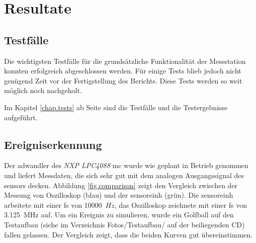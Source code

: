 %
%

\chapter{Resultate}\label{chap.resultate}

\section{Testfälle}
Die wichtigsten Testfälle für die grundsätzliche Funktionalität der Messstation konnten erfolgreich abgeschlossen werden. Für einige Tests blieb jedoch nicht genügend Zeit vor der Fertigstellung des Berichts. Diese Tests werden so weit möglich noch nachgeholt.

Im Kapitel \ref{chap.tests} ab Seite \pageref{chap.tests} sind die Testfälle und die Testergebnisse aufgeführt.

\section{Ereigniserkennung}
Der \gls{adwandler} des \emph{NXP LPC4088} \gls{mc} wurde wie geplant in Betrieb genommen und liefert Messdaten, die sich sehr gut mit dem analogen Ausgangssignal des \gls{sensor}s decken. Abbildung \ref{fig.comparison} zeigt den Vergleich zwischen der Messung von Oszilloskop (blau) und der \gls{sensoreinh} (grün). Die \gls{sensoreinh} arbeitete mit einer \gls{fs} von 10000~\ensuremath{Hz}, das Oszilloskop zeichnete mit einer \gls{fs} von 3.125~MHz auf. Um ein Ereignis zu simulieren, wurde ein Golfball auf den Testaufbau (siehe im Verzeichnis Fotos/Testaufbau/ auf der beiliegenden CD) fallen gelassen. Der Vergleich zeigt, dass die beiden Kurven gut übereinstimmen. 

